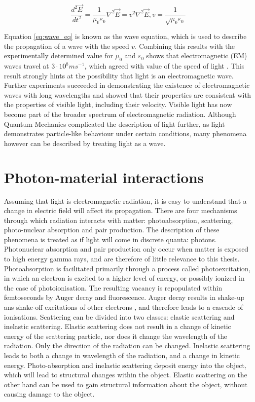\begin{equation}\label{eq:wave_eq}
\frac{d^2\vec{E}}{dt^2} = \frac{1}{\mu_0\varepsilon_0}\nabla^2 \vec{E} = v^2 \nabla^2 \vec{E},      v = \frac{1}{\sqrt{\mu_0\varepsilon_0}}
\end{equation}

Equation \ref{eq:wave_eq} is known as the wave equation, which is used to describe the propagation of a wave with the speed $v$. Combining this results with the experimentally determined value for $\mu_0$ and $\varepsilon_0$ shows that electromagnetic (EM) waves travel at \(3\cdot 10^8 m s^{-1}\), which agreed with value of the speed of light \cite{Froome1971}. This result strongly hints at the possibility that light is an electromagnetic wave. Further experiments succeeded in demonstrating the existence of electromagnetic waves with long wavelengths and showed that their properties are consistent with the properties of visible light, including their velocity. Visible light has now become part of the broader spectrum of electromagnetic radiation. Although Quantum Mechanics complicated the description of light further, as light demonstrates particle-like behaviour under certain conditions, many phenomena however can be described by treating light as a wave. 

\section{Photon-material interactions}
Assuming that light is electromagnetic radiation, it is easy to understand that a change in electric field will affect its propagation. There are four mechanisms through which radiation interacts with matter: photoabsorption, scattering, photo-nuclear absorption and pair production. The description of these phenomena is treated as if light will come in discrete quanta: photons. 
Photonuclear absorption and pair production only occur when matter is exposed to high energy gamma rays, and are therefore of little relevance to this thesis. Photoabsorption is facilitated primarily through a process called photoexcitation, in which an electron is excited to a higher level of energy, or possibly ionized in the case of photoionisation. The resulting vacancy is repopulated within femtoseconds by Auger decay and fluorescence. Auger decay results in shake-up ans shake-off excitations of other electrons \cite{Persson2001}, and therefore leads to a cascade of ionisations. Scattering can be divided into two classes: elastic scattering and inelastic scattering. Elastic scattering does not result in a change of kinetic energy of the scattering particle, nor does it change the wavelength of the radiation. Only the direction of the radiation can be changed. Inelastic scattering leads to both a change in wavelength of the radiation, and a change in kinetic energy. Photo-absorption and inelastic scattering deposit energy into the object, which will lead to structural changes within the object. Elastic scattering on the other hand can be used to gain structural information about the object, without causing damage to the object. 


